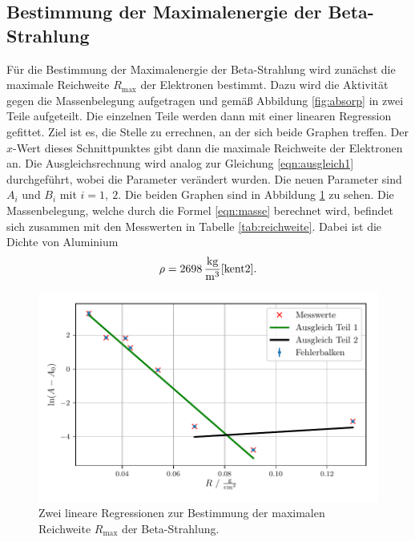\subsection{Bestimmung der Maximalenergie der Beta-Strahlung}
Für die Bestimmung der Maximalenergie der Beta-Strahlung wird zunächst die maximale Reichweite $R_\text{max}$ der Elektronen bestimmt.
Dazu wird die Aktivität gegen die Massenbelegung aufgetragen und gemäß Abbildung \ref{fig:absorp} in zwei Teile aufgeteilt. Die einzelnen Teile
werden dann mit einer linearen Regression gefittet. Ziel ist es, die Stelle zu errechnen, an der sich beide Graphen treffen. Der $x$-Wert dieses
Schnittpunktes gibt dann die maximale Reichweite der Elektronen an. Die Ausgleichsrechnung wird analog zur Gleichung \eqref{eqn:ausgleich1} durchgeführt, wobei
die Parameter verändert wurden. Die neuen Parameter sind $A_i$ und $B_i$ mit $i=1,\: 2$. Die beiden Graphen sind in Abbildung \ref{fig:reichweite} zu sehen.
Die Massenbelegung, welche durch die Formel \eqref{eqn:masse} berechnet wird, befindet sich zusammen mit den Messwerten in Tabelle \ref{tab:reichweite}.
Dabei ist die Dichte von Aluminium
\begin{align*}
\rho = 2698\,\frac{\si{\kilo\gram}}{\si{\cubic\meter}} \text{\cite{kent2}}.
\end{align*}
\begin{figure}[H]
  \center
  \includegraphics[scale = 0.75]{beta.pdf}
  \caption{Zwei lineare Regressionen zur Bestimmung der maximalen Reichweite $R_\text{max}$ der Beta-Strahlung.}
  \label{fig:reichweite}
\end{figure}

